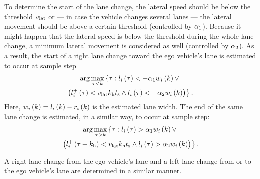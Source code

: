 To determine the start of the lane change, the lateral speed should be below the threshold $v_{\mathrm{lat}}$ or --- in case the vehicle changes several lanes --- the lateral movement should be above a certain threshold (controlled by $\alpha_1$).
Because it might happen that the lateral speed is below the threshold during the whole lane change, a minimum lateral movement is considered as well (controlled by $\alpha_2$). 
As a result, the start of a right lane change toward the ego vehicle's lane is estimated to occur at sample step
\begin{multline}
	\label{eq:start lane change target}
	\arg \max_{\tau < k} \left\{ \tau: l_{i}\left(\tau\right) < -\alpha_1w_{i}\left(k\right) \lor \right. \\
	\left. \left( l^{+}_{i}\left(\tau\right) < v_{\mathrm{lat}}k_{\mathrm{h}}t_\mathrm{s} \land l_{i}\left(\tau\right) < -\alpha_2w_{i}\left(k\right) \right) \right\}.
\end{multline}
Here, $w_{i}\left(k\right)=l_{i}\left(k\right)-r_{i}\left(k\right)$ is the estimated lane width. 
The end of the same lane change is estimated, in a similar way, to occur at sample step:
\begin{multline}
	\label{eq:end lane change target}
	\arg \max_{\tau > k} \left\{ \tau: l_{i}\left(\tau\right) > \alpha_1w_{i}\left(k\right) \lor \right. \\
	\left. \left(l^{+}_{i}\left(\tau+k_{\mathrm{h}}\right) < v_{\mathrm{lat}}k_{\mathrm{h}}t_\mathrm{s} \land l_{i}\left(\tau\right) > \alpha_2w_{i}\left(k\right)\right) \right\}.
\end{multline}

\cendc
\cstartf A right lane change from the ego vehicle's lane and a left lane change from or to the ego vehicle's lane are determined in a similar manner. \cendf



